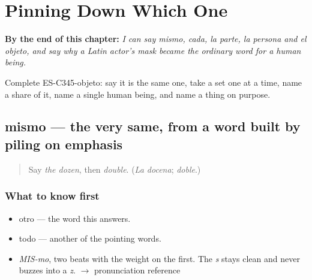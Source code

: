 
\chapter{Pinning Down Which One}
\label{ch:cada-y-mismo}

\begin{chapteropening}
\textbf{By the end of this chapter:} \emph{I can say mismo, cada, la parte, la persona and el objeto, and say why a Latin actor's mask became the ordinary word for a human being.}

Complete ES-C345-objeto: say it is the same one, take a set one at a time, name a share of it, name a single human being, and name a thing on purpose.
\end{chapteropening}

\section[mismo]{mismo — the very same, from a word built by piling on emphasis}

\label{lesson:ES-C345-mismo}



\begin{quote}
Say \emph{the dozen}, then \emph{double}. (\emph{La docena}; \emph{doble}.)
\end{quote}

\subsection*{What to know first}
\begin{itemize}
\raggedright
  \item otro — the word this answers.
  \item todo — another of the pointing words.
\end{itemize}

\begin{sounds}
\begin{itemize}
\raggedright
  \item \emph{MIS-mo}, two beats with the weight on the first. The \emph{s} stays clean and never buzzes into a \emph{z}. $\to$ pronunciation reference
\end{itemize}
\end{sounds}

